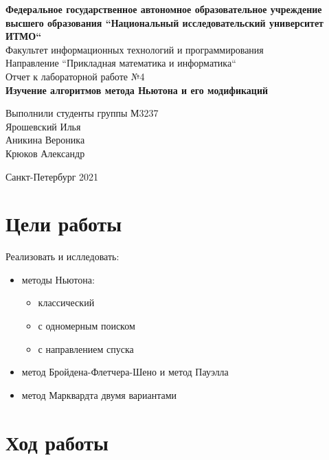 \documentclass[english]{article}
\date{}
\title{}
\begin{document}
\begin{titlepage}
  \begin{center}
    \large\textbf{Федеральное государственное автономное образовательное учреждение высшего образования ``Национальный исследовательский университет ИТМО``} \\
    \vspace{0.5cm}
    Факультет информационных технологий и программирования \\
    \vspace{0.5cm}
    Направление ``Прикладная математика и информатика`` \\
    \vspace{3cm}
    Отчет к лабораторной работе №4 \\
    \vspace{0.5cm}
    \textbf{Изучение алгоритмов метода Ньютона и его модификаций}
  \end{center}
  \vfill
  \begin{flushright}
    \large
    Выполнили студенты группы М3237 \\
    \vspace{0.5cm}
    Ярошевский Илья \\
    Аникина Вероника \\
    Крюков Александр
  \end{flushright}
  \vspace{3cm}
  \begin{center}
    Санкт-Петербург 2021
  \end{center}
\end{titlepage}
\section{Цели работы}
Реализовать и ислледовать:
\begin{itemize}
\item методы Ньютона:
  \begin{itemize}
  \item классический
  \item с одномерным поиском
  \item с направлением спуска
  \end{itemize}
\item метод Бройдена-Флетчера-Шено и метод Пауэлла
\item метод Марквардта двумя вариантами
\end{itemize}
\section{Ход работы}
\end{document}
